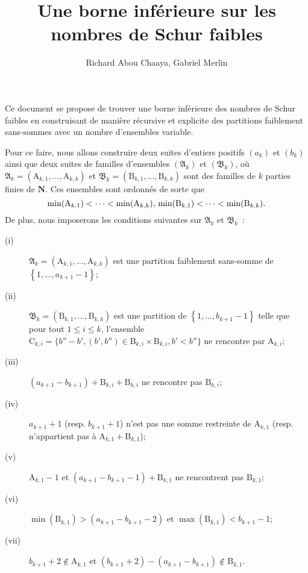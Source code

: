 \documentclass[11pt, oneside]{article}   	%
\title{Une borne inférieure sur les nombres de Schur faibles}
\author{Richard Abou Chaaya, Gabriel Merlin}
\newcommand{\interval}[2]{\left\{ #1, \dots, #2 \right\}}
\begin{document}
\maketitle

Ce document se propose de trouver une borne inférieure des nombres de Schur faibles
en construisant de manière récursive et explicite des partitions faiblement sans-sommes avec un nombre d'ensembles variable.

Pour ce faire, nous allons construire deux suites d'entiers positifs $(a_k)$ et $(b_k)$
ainsi que deux suites de familles d'ensembles $(\mathfrak{A}_k)$ et $(\mathfrak{B}_k)$,
où $\mathfrak{A}_k = (\mathrm{A}_{k, 1}, \dots, \mathrm{A}_{k, k})$ et $\mathfrak{B}_k = (\mathrm{B}_{k, 1}, \dots, \mathrm{B}_{k, k})$
sont des familles de $k$ parties finies de $\mathbf{N}$.
Ces ensembles sont ordonnés de sorte que
\begin{equation}
 \min(\mathrm{A}_{k, 1}) < \dots < \min(\mathrm{A}_{k, k}), \\
 \min(\mathrm{B}_{k, 1}) < \dots < \min(\mathrm{B}_{k, k}).
\end{equation}
De plus, nous imposerons les conditions suivantes sur $\mathfrak{A}_k$ et $\mathfrak{B}_k$~:
\begin{description}
\item[(i)] $\mathfrak{A}_k = (\mathrm{A}_{k, 1}, \dots, \mathrm{A}_{k, k})$ est une partition faiblement sans-somme de $\interval{1}{a_{k+1} - 1}$;
\item[(ii)] $\mathfrak{B}_k = (\mathrm{B}_{k, 1}, \dots, \mathrm{B}_{k, k})$ est une partition de $\interval{1}{b_{k+1}-1}$ telle que
 pour tout $1 \leqslant i \leqslant k$, l'ensemble $\mathrm{C}_{k, i} = \{ b'' - b', (b', b'') \in \mathrm{B}_{k, i} \times \mathrm{B}_{k,i}, b' < b''\}$
 ne rencontre par $\mathrm{A}_{k, i}$;
\item[(iii)] $(a_{k+1} - b_{k+1}) + \mathrm{B}_{k, i} + \mathrm{B}_{k, i}$ ne rencontre pas $\mathrm{B}_{k, i}$;
\item[(iv)] $a_{k+1} + 1$ (resp. $b_{k+1} + 1$) n'est pas une somme restreinte de $\mathrm{A}_{k, 1}$ (resp. n'appartient pas à $\mathrm{A}_{k, 1} + \mathrm{B}_{k, 1}$);
\item[(v)] $\mathrm{A}_{k, 1} - 1$ et $(a_{k+1} - b_{k+1} - 1) + \mathrm{B}_{k, 1}$ ne rencontrent pas $\mathrm{B}_{k, 1}$;
\item[(vi)] $\min(\mathrm{B}_{k, 1}) > (a_{k+1} - b_{k+1} - 2)$ et $\max(\mathrm{B}_{k, 1}) < b_{k+1} - 1$;
\item[(vii)] $b_{k+1} + 2 \notin \mathrm{A}_{k, 1}$ et $(b_{k + 1} + 2) - (a_{k+1} - b_{k+1}) \notin \mathrm{B}_{k, 1}$.
\end{description}
\end{document}
